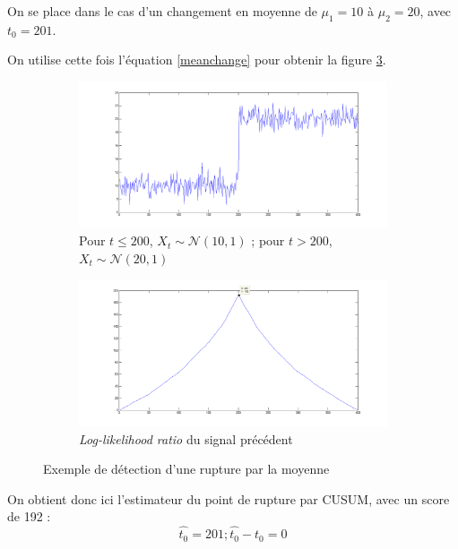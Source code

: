\documentclass[french,11pt,notitlepage]{report}
\begin{document}
	On se place dans le cas d'un changement en moyenne de $\mu_1 = 10$ à $\mu_2 = 20$, avec $t_0 = 201$.
	
	On utilise cette fois l'équation \ref{meanchange} pour obtenir la figure \ref{llr_test_mean}.


	\begin{figure}[h]	
		\begin{subfigure}[t]{.49\textwidth}

  \includegraphics[width=\linewidth]{test_signal_mean.png}
		\caption{Pour $t \leq 200$, $X_t \sim \mathcal{N}(10, 1)$ ; pour $t > 200$, $X_t \sim \mathcal{N}(20, 1)$}
		\label{test_signal_mean}
	\end{subfigure}
	\hfill
	\begin{subfigure}[t]{.49\textwidth}

  \includegraphics[width=\linewidth]{llr_test_mean.png}
		\caption{\textit{Log-likelihood ratio} du signal précédent}
		\label{llr_test_mean}
	\end{subfigure}
	
	\caption{Exemple de détection d'une rupture par la moyenne}
	\end{figure}
	
	On obtient donc ici l'estimateur du point de rupture par CUSUM, avec un score de 192 :
	\begin{equation*}
		\hat{t_0} = 201 ; \hat{t_0} - t_0 = 0
	\end{equation*}
	
\end{document}
